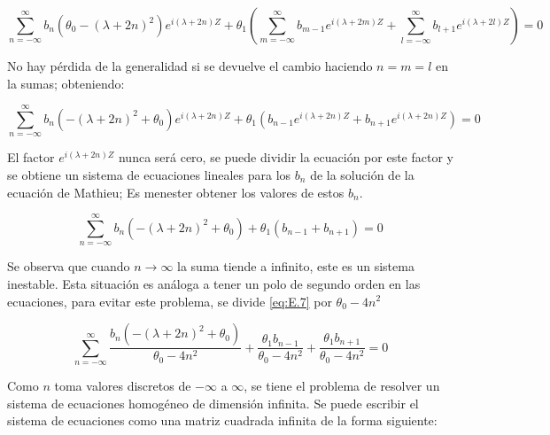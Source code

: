 \begin{equation}\label{eq:E.5}
    \sum^{\infty}_{n=-\infty} b_n\left(\theta_0-\left(\lambda+2n\right)^2\right)e^{i\left(\lambda+2n\right) Z}+\theta_1\left( \sum^{\infty}_{m=-\infty}b_{m-1}e^{i\left(\lambda+2m\right)Z}+\sum^{\infty}_{l=-\infty}b_{l+1}e^{i\left(\lambda+2l\right)Z}\right)=0
\end{equation}

No hay pérdida de la generalidad si se devuelve el cambio haciendo $n=m=l$ en la sumas; obteniendo:

\begin{equation}\label{eq:E.6}
    \sum^{\infty}_{n=-\infty} b_n\left(-(\lambda+2n)^2+\theta_0\right)e^{i(\lambda+2n) Z}+\theta_1( b_{n-1}e^{i(\lambda+2n)Z}+b_{n+1}e^{i(\lambda+2n)Z})=0
\end{equation}

El factor $e^{i(\lambda+2n)Z}$ nunca será cero, se puede dividir la ecuación por este factor y se obtiene un sistema de ecuaciones lineales para los $b_n$ de la solución de la ecuación de Mathieu; Es menester obtener los valores de estos $b_n$.

\begin{equation}\label{eq:E.7}
    \sum^{\infty}_{n=-\infty} b_n\left(-(\lambda+2n)^2+\theta_0\right) +\theta_1( b_{n-1}+b_{n+1})=0
\end{equation}

Se observa que cuando $n \rightarrow \infty$ la suma tiende a infinito, este es un sistema inestable. Esta situación es análoga a tener un polo de segundo orden \cite{Phelps} en las ecuaciones, para evitar este problema, se divide \ref{eq:E.7} por $\theta_0-4n^2$

\begin{equation}\label{eq:E.8}
    \sum^{\infty}_{n=-\infty} \frac{b_n\left(-(\lambda+2n)^2+\theta_0\right)}{\theta_0-4n^2}+\frac{\theta_1b_{n-1}}{\theta_0-4n^2}+\frac{\theta_1b_{n+1}}{\theta_0-4n^2}=0
\end{equation}

Como $n$ toma valores discretos de $-\infty$ a $\infty$, se tiene el problema de resolver un sistema de ecuaciones homogéneo de dimensión infinita. Se puede escribir el sistema de ecuaciones como una matriz cuadrada infinita de la forma siguiente:

